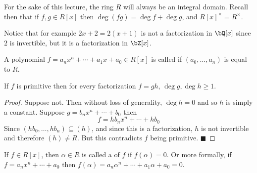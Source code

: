 \documentclass[10pt]{article}
\def\qed{\hskip1cm\hbox{}\hfill$\blacksquare$}
\begin{document}


\bigskip

For the sake of this lecture, the ring $R$ will always be an integral domain.
Recall then that if $f,g\in R[x]$ then $\deg(fg)=\deg f+\deg g$, and $R[x]^\times=R^\times$.

\begin{exam*}

    Notice that for example $2x+2=2(x+1)$ is not a factorization in $\bQ[x]$ since $2$ is invertible, but it is a factorization in $\bZ[x]$.

\end{exam*}

\begin{defn*}

    A polynomial $f=a_nx^n+\cdots+a_1x+a_0\in R[x]$ is called  if $(a_0,\dots,a_n)$ is equal to $R$.

\end{defn*}

\begin{prop*}

    If $f$ is primitive then for every factorization $f=gh$, $\deg g,\deg h\geq1$.

\end{prop*}

\begin{proof}

    Suppose not.
    Then without loss of generality, $\deg h=0$ and so $h$ is simply a constant.
    Suppose $g=b_nx^n+\cdots+b_0$ then
    \[ f = hb_nx^n + \cdots + hb_0 \]
    Since $(hb_0,\dots,hb_n)\subseteq(h)$, and since this is a factorization, $h$ is not invertible and therefore $(h)\neq R$.
    But this contradicts $f$ being primitive.
    \qed

\end{proof}

\begin{defn*}

    If $f\in R[x]$, then $\alpha\in R$ is called a  of $f$ if $f(\alpha)=0$.
    Or more formally, if $f=a_nx^n+\cdots+a_0$ then $f(\alpha)=a_n\alpha^n+\cdots+a_1\alpha+a_0=0$.

\end{defn*}
\end{document}
